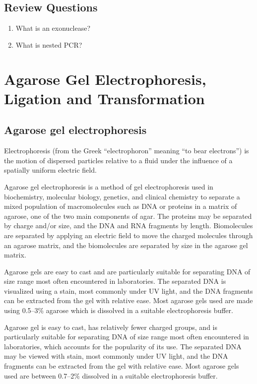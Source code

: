 \documentclass[]{book}
\providecommand{\tightlist}{%
  \setlength{\itemsep}{0pt}\setlength{\parskip}{0pt}}
\theoremstyle{definition}
\theoremstyle{definition}
\theoremstyle{definition}
\theoremstyle{remark}
\begin{document}
\section{Review Questions}\label{review-questions-6}

\begin{enumerate}
\def\labelenumi{\arabic{enumi}.}
\tightlist
\item
  What is an exonuclease?
\item
  What is nested PCR?
\end{enumerate}

\chapter{Agarose Gel Electrophoresis, Ligation and
Transformation}\label{agarose-gel-electrophoresis-ligation-and-transformation}

\section{Agarose gel electrophoresis}\label{agarose-gel-electrophoresis}

Electrophoresis (from the Greek ``electrophoron'' meaning ``to bear
electrons'') is the motion of dispersed particles relative to a fluid
under the influence of a spatially uniform electric field.

Agarose gel electrophoresis is a method of gel electrophoresis used in
biochemistry, molecular biology, genetics, and clinical chemistry to
separate a mixed population of macromolecules such as DNA or proteins in
a matrix of agarose, one of the two main components of agar. The
proteins may be separated by charge and/or size, and the DNA and RNA
fragments by length. Biomolecules are separated by applying an electric
field to move the charged molecules through an agarose matrix, and the
biomolecules are separated by size in the agarose gel matrix.

Agarose gels are easy to cast and are particularly suitable for
separating DNA of size range most often encountered in laboratories. The
separated DNA is visualized using a stain, most commonly under UV light,
and the DNA fragments can be extracted from the gel with relative ease.
Most agarose gels used are made using 0.5--3\% agarose which is
dissolved in a suitable electrophoresis buffer.

Agarose gel is easy to cast, has relatively fewer charged groups, and is
particularly suitable for separating DNA of size range most often
encountered in laboratories, which accounts for the popularity of its
use. The separated DNA may be viewed with stain, most commonly under UV
light, and the DNA fragments can be extracted from the gel with relative
ease. Most agarose gels used are between 0.7--2\% dissolved in a
suitable electrophoresis buffer.
\end{document}
